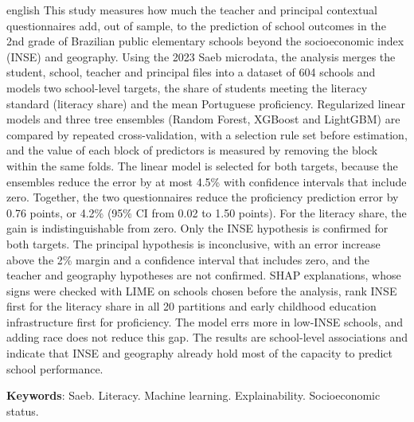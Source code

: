 \begin{resumo}[Abstract]
\begin{otherlanguage*}{english}
This study measures how much the teacher and principal contextual
questionnaires add, out of sample, to the prediction of school outcomes in
the 2nd grade of Brazilian public elementary schools beyond the
socioeconomic index (INSE) and geography. Using the 2023 Saeb microdata,
the analysis merges the student, school, teacher and principal files into a
dataset of 604 schools and models two school-level targets, the share of
students meeting the literacy standard (literacy share) and the mean
Portuguese proficiency. Regularized linear models and
three tree ensembles (Random Forest, XGBoost and LightGBM) are compared by
repeated cross-validation, with a selection rule set before estimation, and
the value of each block of predictors is measured by removing the block
within the same folds. The linear model is selected for both targets,
because the ensembles reduce the error by at most 4.5\% with confidence
intervals that include zero. Together, the two questionnaires reduce the
proficiency prediction error by 0.76 points, or 4.2\% (95\% CI from 0.02
to 1.50 points). For the literacy share, the gain is indistinguishable from
zero. Only the INSE hypothesis is confirmed for both targets. The principal
hypothesis is inconclusive, with an error increase above the 2\% margin and
a confidence interval that includes zero, and the teacher and
geography hypotheses are not confirmed. SHAP explanations, whose signs were checked with
LIME on schools chosen before the analysis, rank INSE first for the
literacy share in all 20 partitions and early childhood education
infrastructure first for proficiency. The model errs more in low-INSE
schools, and adding race does not reduce this gap. The results are
school-level associations and indicate that INSE and geography already
hold most of the capacity to predict school performance.

\vspace{\onelineskip}
\noindent\textbf{Keywords}: Saeb. Literacy. Machine learning. Explainability. Socioeconomic status.
\end{otherlanguage*}
\end{resumo}

\listoffigures*
\cleardoublepage

\listoftables*
\cleardoublepage

\listadequadros
\cleardoublepage

